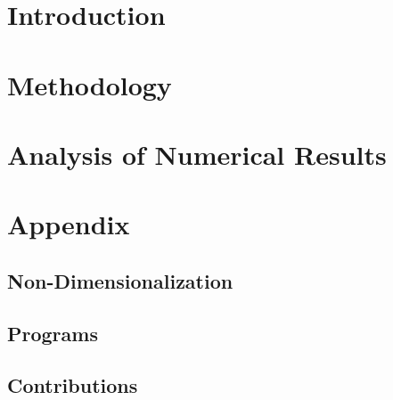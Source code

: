 \documentclass[12pt]{article}
\numberwithin{equation}{section}
\begin{document}
\tableofcontents
\newpage
\section{Introduction}


\section{Methodology}
\section{Analysis of Numerical Results}
\section{Appendix}
    \subsection{Non-Dimensionalization}
    \subsection{Programs}
    \subsection{Contributions}
\end{document}
